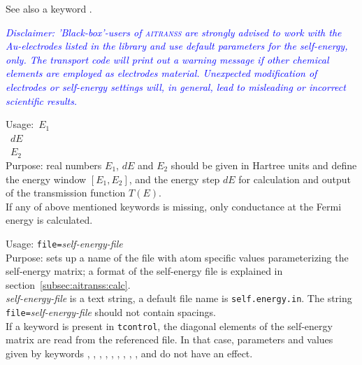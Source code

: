 See also a keyword .

\emph{\textcolor{blue}{Disclaimer: 'Black-box'-users of \textsc{aitranss}
are strongly advised to work with the Au-electrodes listed in the library
and use default parameters for the self-energy, only.  The transport
code will print out a warning message if other chemical elements are
employed as electrodes material. Unexpected modification of electrodes
or self-energy settings will, in general, lead to misleading or incorrect
scientific results.}}

\newpage


{
 \noindent Usage:\ \phantom{a}\quad $E_1$ \\
 \phantom{Usage:}\ \quad $dE$ \\ 
 \phantom{Usage:}\ \phantom{a}\quad $E_2$ \\[1.0ex] 
 Purpose: real numbers
 $E_1$, $dE$ and $E_2$ should be given in Hartree units and define the
 energy window $[E_1,E_2]$, and the energy step $dE$ for calculation
 and output of the transmission function $T(E)$. \\
}
If any of above mentioned keywords is missing, only conductance at the
Fermi energy is calculated.


{
 \noindent 
 Usage:  \quad \texttt{file=}\textit{self-energy-file} \\ [1.0ex] 
 Purpose: sets up a name of the file with atom specific values parameterizing 
 the self-energy matrix; a format of the self-energy file is explained in
 section~\ref{subsec:aitranss:calc}. \\[1.0ex] 
 \textit{self-energy-file} is a text string, a default file name is 
 \texttt{self.energy.in}. The string \mbox{\texttt{file=}\textit{self-energy-file}} 
 should not contain spacings. \\
}
If a keyword  is present in \texttt{tcontrol},
the diagonal elements of the self-energy matrix are read from
the referenced file. In that case, parameters and values given by
keywords , , ,
, , ,
, , , and
 do not have an effect.

